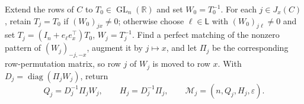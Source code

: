 Extend the rows of \(C\) to \(T_0\in\operatorname{GL}_n(\mathbb R)\) and set \(W_0=T_0^{-1}\). For each \(j\in J_x(C)\), retain \(T_j=T_0\) if \((W_0)_{jx}\ne0\); otherwise choose \(\ell\in\mathsf L\) with \((W_0)_{j\ell}\ne0\) and set \(T_j=(I_n+e_\ell e_x^\top)T_0\), \(W_j=T_j^{-1}\). Find a perfect matching of the nonzero pattern of \((W_j)_{-j,-x}\), augment it by \(j\mapsto x\), and let \(\Pi_j\) be the corresponding row-permutation matrix, so row \(j\) of \(W_j\) is moved to row \(x\). With \(D_j=\operatorname{diag}(\Pi_jW_j)\), return
\[
Q_j=D_j^{-1}\Pi_jW_j,\qquad H_j=D_j^{-1}\Pi_j,\qquad
\mathcal M_j=(n,Q_j,H_j,\varepsilon).
\]